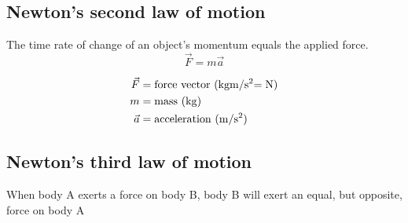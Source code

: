 \documentclass{article}
\begin{document}
\subsection{Newton's second law of motion}
\begin{multicols}{2}
	The time rate of change of an object's momentum equals the applied force.
	\vfill\null
	\columnbreak
	\begin{equation*}
	\boxed{\vec{F} = m\vec{a}}
	\end{equation*}

	\begin{align*}
	\vec{F} &= \text{force vector (\si{\kilo\gram\meter\per\second\squared = \newton})}\\
	m &= \text{mass (\si{\kilo\gram})}\\
	\vec{a} &= \text{acceleration  (\si{\meter\per\second\squared})}\\
	\end{align*}
\end{multicols}

\subsection{Newton's third law of motion}
When body A exerts a force on body B, body B will exert an equal, but opposite, force on body A
\end{document}
